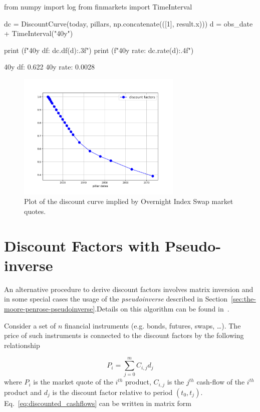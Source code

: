 \begin{ipython}
from numpy import log
from finmarkets import TimeInterval

dc = DiscountCurve(today, pillars, np.concatenate(([1], result.x)))
d = obs_date + TimeInterval("40y")

print (f"40y df: {dc.df(d):.3f}")
print (f"40y rate: {dc.rate(d):.4f}")
\end{ipython}
\begin{ioutput}
40y df: 0.622
40y rate: 0.0028
\end{ioutput}

\begin{figure}[htb]
	\centering
	\includegraphics[width=0.7\textwidth]{figures/example_discount_curve}
	\caption{Plot of the discount curve implied by Overnight Index Swap market quotes.}
	\label{fig:discount_curve}
\end{figure}

\section{Discount Factors with Pseudo-inverse}
An alternative procedure to derive discount factors involves matrix inversion and in some special cases the usage of the \emph{pseudoinverse} described in Section~\ref{sec:the-moore-penrose-pseudoinverse}.Details on this algorithm can be found in~\cite{bib:boostrap_pseudoinv}.

Consider a set of $n$ financial instruments (e.g. bonds, futures, swaps, \ldots). The price of such instruments is connected to the discount factors by the following relationship

\begin{equation}
P_i = \sum_{j=0}^{m} C_{i,j} d_j
\label{eq:discounted_cashflows}
\end{equation}
where $P_i$ is the market quote of the $i^{th}$ product, $C_{i,j}$ is the $j^{th}$ cash-flow of the $i^{th}$ product and $d_j$ is the discount factor relative to period $(t_0, t_j)$.
Eq.~\ref{eq:discounted_cashflows} can be written in matrix form

